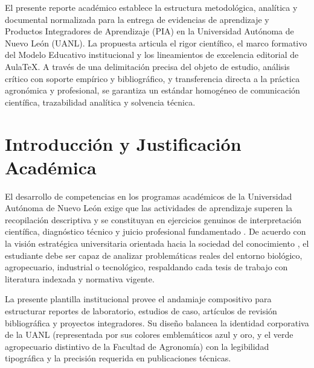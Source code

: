 \documentclass[
	spanish,
	letterpaper, oneside
]{article}
\begin{document}
\templatePortrait

\templatePagecfg

\begin{abstractd}
El presente reporte académico establece la estructura metodológica, analítica y documental normalizada para la entrega de evidencias de aprendizaje y Productos Integradores de Aprendizaje (PIA) en la Universidad Autónoma de Nuevo León (UANL). La propuesta articula el rigor científico, el marco formativo del Modelo Educativo institucional y los lineamientos de excelencia editorial de AulaTeX. A través de una delimitación precisa del objeto de estudio, análisis crítico con soporte empírico y bibliográfico, y transferencia directa a la práctica agronómica y profesional, se garantiza un estándar homogéneo de comunicación científica, trazabilidad analítica y solvencia técnica.
\end{abstractd}

\templateIndex

\templateFinalcfg


\section{Introducción y Justificación Académica}

El desarrollo de competencias en los programas académicos de la Universidad Autónoma de Nuevo León exige que las actividades de aprendizaje superen la recopilación descriptiva y se constituyan en ejercicios genuinos de interpretación científica, diagnóstico técnico y juicio profesional fundamentado \citep{uanlModeloEducativo2022}. De acuerdo con la visión estratégica universitaria orientada hacia la sociedad del conocimiento \citep{uanlVision2030}, el estudiante debe ser capaz de analizar problemáticas reales del entorno biológico, agropecuario, industrial o tecnológico, respaldando cada tesis de trabajo con literatura indexada y normativa vigente.

La presente plantilla institucional provee el andamiaje compositivo para estructurar reportes de laboratorio, estudios de caso, artículos de revisión bibliográfica y proyectos integradores. Su diseño balancea la identidad corporativa de la UANL (representada por sus colores emblemáticos azul y oro, y el verde agropecuario distintivo de la Facultad de Agronomía) con la legibilidad tipográfica y la precisión requerida en publicaciones técnicas.
\end{document}
